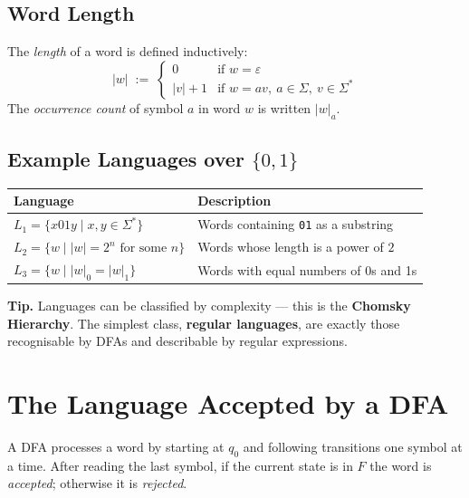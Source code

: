 \documentclass[11pt, a4paper]{article}
\theoremstyle{definition}
\theoremstyle{remark}
\begin{document}
\subsection{Word Length}

The \emph{length} of a word is defined inductively:
\[
  |w| \;:=\;
  \begin{cases}
    0     & \text{if }w=\varepsilon \\
    |v|+1 & \text{if }w=av,\ a\in\Sigma,\ v\in\Sigma^*
  \end{cases}
\]
The \emph{occurrence count} of symbol $a$ in word $w$ is written $|w|_a$.

\subsection{Example Languages over $\{0,1\}$}

\begin{center}
\begin{tabular}{ll}
  \toprule
  Language & Description \\
  \midrule
  $L_1=\{x01y\mid x,y\in\Sigma^*\}$           & Words containing \texttt{01} as a substring \\
  $L_2=\{w\mid|w|=2^n\text{ for some }n\}$    & Words whose length is a power of $2$ \\
  $L_3=\{w\mid|w|_0=|w|_1\}$                  & Words with equal numbers of 0s and 1s \\
  \bottomrule
\end{tabular}
\end{center}

\begin{insightbox}
\textbf{Tip.}  Languages can be classified by complexity --- this is the \textbf{Chomsky
Hierarchy}.  The simplest class, \textbf{regular languages}, are exactly those recognisable
by DFAs and describable by regular expressions.
\end{insightbox}

\section{The Language Accepted by a DFA}

A DFA processes a word by starting at $q_0$ and following transitions one symbol at a time.
After reading the last symbol, if the current state is in $F$ the word is \emph{accepted};
otherwise it is \emph{rejected}.
\end{document}

